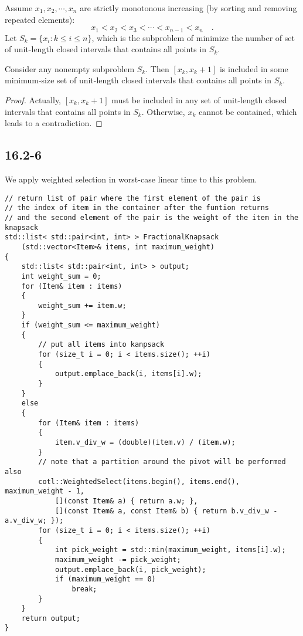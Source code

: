 Assume $x_1, x_2, \cdots, x_n$ are strictly monotonous increasing
(by sorting and removing repeated elements):
\begin{equation*}
    x_1 < x_2 < x_3 < \cdots < x_{n-1} < x_n
    \quad .
\end{equation*}
Let $S_k = \{ x_i : k \leq i \leq n \}$,
which is the subproblem of minimize the number of set of unit-length closed intervals
that contains all points in $S_k$.

\begin{claim}
    Consider any nonempty subproblem $S_k$.
    Then $[x_k, x_k + 1]$ is included in some minimum-size set of unit-length closed intervals
    that contains all points in $S_k$.
\end{claim}

\begin{proof}
    Actually, $[x_k, x_k + 1]$ must be included in any set of unit-length closed intervals
    that contains all points in $S_k$.
    Otherwise, $x_k$ cannot be contained, which leads to a contradiction.
\end{proof}

\subsection*{16.2-6}

We apply weighted selection in worst-case linear time to this problem.

\begin{verbatim}
// return list of pair where the first element of the pair is 
// the index of item in the container after the funtion returns 
// and the second element of the pair is the weight of the item in the knapsack
std::list< std::pair<int, int> > FractionalKnapsack
    (std::vector<Item>& items, int maximum_weight)
{
    std::list< std::pair<int, int> > output;
    int weight_sum = 0;
    for (Item& item : items)
    {
        weight_sum += item.w;
    }
    if (weight_sum <= maximum_weight)
    {
        // put all items into kanpsack
        for (size_t i = 0; i < items.size(); ++i)
        {
            output.emplace_back(i, items[i].w);
        }
    }
    else
    {
        for (Item& item : items)
        {
            item.v_div_w = (double)(item.v) / (item.w);
        }
        // note that a partition around the pivot will be performed also
        cotl::WeightedSelect(items.begin(), items.end(), maximum_weight - 1, 
            [](const Item& a) { return a.w; }, 
            [](const Item& a, const Item& b) { return b.v_div_w - a.v_div_w; });
        for (size_t i = 0; i < items.size(); ++i)
        {
            int pick_weight = std::min(maximum_weight, items[i].w);
            maximum_weight -= pick_weight;
            output.emplace_back(i, pick_weight);
            if (maximum_weight == 0)
                break;
        }
    }
    return output;
}
\end{verbatim}


